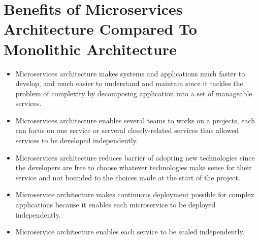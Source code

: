 \documentclass[11pt,a4paper]{article}
\begin{document}
	\section{Benefits of Microservices Architecture Compared To Monolithic Architecture}
		\begin{itemize}
			\item Microservices architecture makes systems and applications much faster to develop, and much easier to understand and maintain since it tackles the problem of complexity by decomposing application into a set of manageable services.
			\item Microservices architecture enables several teams to works on a projects, each can focus on one service or serveral closely-related services thus allowed services to be developed independently. 
			\item  Microservices architecture reduces barrier of adopting new technologies since the developers are free to choose whatever technologies make sense for their service and not bounded to the choices made at the start of the project.
			\item Microservice architecture makes continuous deployment possible for complex applications because it enables each microservice to be deployed independently.
			\item Microservice architecture enables each service to be scaled independently.
		\end{itemize}
\end{document}
